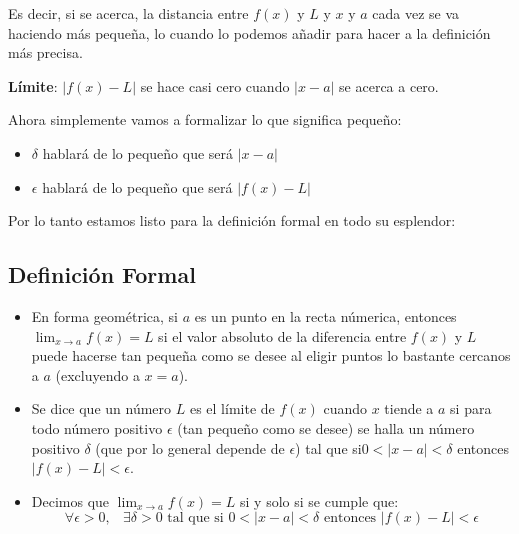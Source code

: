 \documentclass[12pt, fleqn]{report}                             %
\DeclareMathOperator \Space     {\quad}                         %
\DeclareMathOperator \MiniSpace {\;}                            %
\theoremstyle{break}                                            %
\begin{document}
            Es decir, si se acerca, la distancia entre $f(x)$ y $L$ y $x$ y $a$ cada vez 
            se va haciendo más pequeña, lo cuando lo podemos añadir para hacer a la definición
            más precisa.

            \textbf{Límite}: $|f(x)-L|$ se hace casi cero cuando $|x-a|$ se acerca a cero.

            Ahora simplemente vamos a formalizar lo que significa pequeño:
            \begin{itemize}
                 \item $\delta$ hablará de lo pequeño que será $|x-a|$
                 \item $\epsilon$ hablará de lo pequeño que será $|f(x)-L|$
             \end{itemize} 

            Por lo tanto estamos listo para la definición formal en todo su esplendor:


            \subsection{Definición Formal}

                \begin{itemize}

                    \item
                        En forma geométrica, si $a$ es un punto en la recta númerica, entonces
                        $\lim_{x \to a} f(x) = L$ si el valor absoluto de la diferencia entre
                        $f(x)$ y $L$ puede hacerse tan pequeña como se desee al eligir puntos
                        lo bastante cercanos a $a$ (excluyendo a $x = a$).

                    \item
                        Se dice que un número $L$ es el límite de $f(x)$ cuando $x$ tiende a $a$
                        si para todo número positivo $\epsilon$ (tan pequeño como se desee) se
                        halla un número positivo $\delta$ (que por lo general depende de $\epsilon$)
                        tal que si$0 < |x - a| < \delta$ entonces $|f(x) - L| < \epsilon$.

                    \item 
                        Decimos que $\lim_{x \to a} f(x) = L$ si y solo si se cumple que:
                        \begin{equation*}
                            \forall \epsilon > 0, \MiniSpace
                                \exists \delta > 0 \text{ tal que si }
                                    0 < |x - a| < \delta \text{ entonces } |f(x) - L| < \epsilon 
                        \end{equation*}

                \end{itemize}
\end{document}
